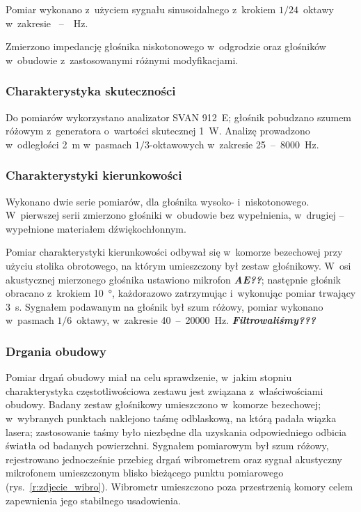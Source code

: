 \documentclass[12pt]{oska}
\newcommand{\range}[2]{\num{#1}~--~\num{#2}}
\newcommand{\comment}[1]{{\color{magenta}\emph{\textbf{#1}}}}
\begin{document}
			
			Pomiar wykonano z~użyciem sygnału sinusoidalnego z~krokiem $1/24$~oktawy w~zakresie \range{}{}~\si{\Hz}.
			
			Zmierzono impedancję głośnika niskotonowego w~odgrodzie oraz głośników w~obudowie z~zastosowanymi różnymi modyfikacjami. 
			
			
			
		\subsubsection{Charakterystyka skuteczności}
			
			Do pomiarów wykorzystano analizator SVAN 912~E; głośnik pobudzano szumem różowym z~generatora o~wartości skutecznej \SI{1}{\watt}. Analizę prowadzono w~odległości \SI{2}{\metre} w~pasmach $1/3$-oktawowych w~zakresie \range{25}{8000}~\si{\Hz}.
			
		\subsubsection{Charakterystyki kierunkowości}
			
			Wykonano dwie serie pomiarów, dla głośnika wysoko- i~niskotonowego. W~pierwszej serii zmierzono głośniki w~obudowie bez wypełnienia, w~drugiej -- wypełnione materiałem dźwiękochłonnym.
			
			Pomiar charakterystyki kierunkowości odbywał się w~komorze bezechowej przy użyciu stolika obrotowego, na którym umieszczony był zestaw głośnikowy. W~osi akustycznej mierzonego głośnika ustawiono mikrofon \comment{AE??}; następnie głośnik obracano z~krokiem \SI{10}{\degree}, każdorazowo zatrzymując i~wykonując pomiar trwający \SI{3}{\s}. Sygnałem podawanym na głośnik był szum różowy, pomiar wykonano w~pasmach $1/6$~oktawy, w~zakresie \range{40}{20000}~\si{\Hz}. \comment{Filtrowaliśmy???}

			
		\subsubsection{Drgania obudowy}
			
			Pomiar drgań obudowy miał na celu sprawdzenie, w~jakim stopniu charakterystyka częstotliwościowa zestawu jest związana z~właściwościami obudowy. Badany zestaw głośnikowy umieszczono w~komorze bezechowej; w~wybranych punktach naklejono taśmę odblaskową, na którą padała wiązka lasera; zastosowanie taśmy było niezbędne dla uzyskania odpowiedniego odbicia światła od badanych powierzchni. %
			Sygnałem pomiarowym był szum różowy, rejestrowano jednocześnie przebieg drgań wibrometrem oraz sygnał akustyczny mikrofonem umieszczonym blisko bieżącego punktu pomiarowego (rys.~\ref{r:zdjecie_wibro}). Wibrometr umieszczono poza przestrzenią komory celem zapewnienia jego stabilnego usadowienia.
			
\end{document}
